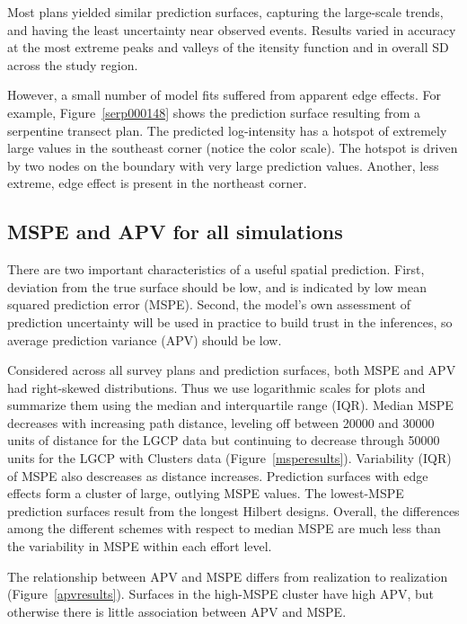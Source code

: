 \documentclass[review]{elsarticle}
\begin{document}
Most plans yielded similar prediction surfaces, capturing the large-scale
trends, and having the least uncertainty near observed events. Results varied
in accuracy at the most extreme peaks and valleys of the itensity function and
in overall SD across the study region.

However, a small number of model fits suffered from apparent edge effects.
For example, Figure~\ref{serp000148} shows the prediction surface resulting
from a serpentine transect plan. The predicted log-intensity has a hotspot of
extremely large values in the southeast corner (notice the color scale). The
hotspot is driven by two nodes on the boundary with very large prediction
values. Another, less extreme, edge effect is present in the northeast corner.


\subsection{MSPE and APV for all simulations}

There are two important characteristics of a useful spatial prediction. First,
deviation from the true surface should be low, and is indicated by low
mean squared prediction error (MSPE). Second, the model's own assessment of
prediction uncertainty will be used in practice to build trust in the
inferences, so average prediction variance (APV) should be low.

Considered across all survey plans and prediction surfaces, both MSPE and APV
had right-skewed distributions. Thus we use logarithmic scales for plots and
summarize them using the median and interquartile range (IQR). Median MSPE
decreases with increasing path distance, leveling off between 20000 and 30000
units of distance for the LGCP data but continuing to decrease through 50000
units for the LGCP with Clusters data (Figure~\ref{msperesults}). Variability
(IQR) of MSPE also descreases as distance increases. Prediction surfaces with
edge effects form a cluster of large, outlying MSPE values. The lowest-MSPE
prediction surfaces result from the longest Hilbert designs. Overall, the
differences among the different schemes with respect to median MSPE are much
less than the variability in MSPE within each effort level.

The relationship between APV and MSPE differs from realization to realization
(Figure~\ref{apvresults}). Surfaces in the high-MSPE cluster have high APV, but
otherwise there is little association between APV and MSPE.
\end{document}
